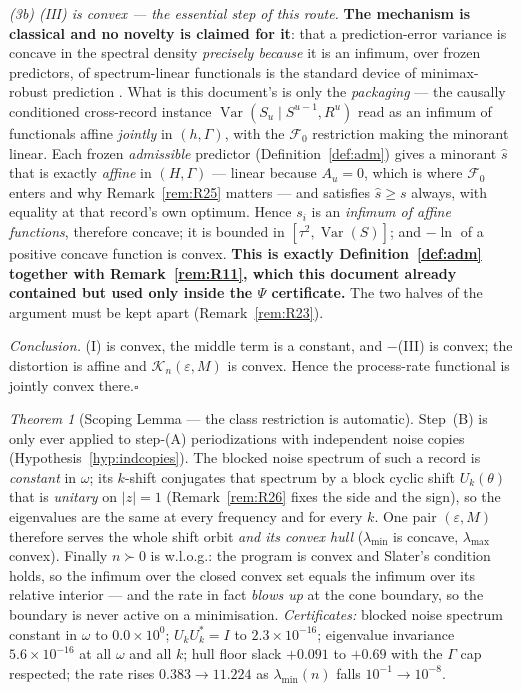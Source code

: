 \documentclass[11pt]{article}
\theoremstyle{definition}
\theoremstyle{remark}
\newtheorem{namedthm}{Theorem}
\begin{document}
\emph{(3b) (III) is convex --- the essential step of this route.}
\textbf{The mechanism is classical and no novelty is claimed for it}:
that a prediction-error variance is concave in the spectral density
\emph{precisely because} it is an infimum, over frozen predictors, of
spectrum-linear functionals is the standard device of minimax-robust
prediction \cite{bib:vp84,bib:franke85}. What is this document's is
only the \emph{packaging} --- the causally conditioned cross-record
instance $\operatorname{Var}(S_u\mid S^{u-1},R^u)$ read as an infimum
of functionals affine \emph{jointly} in $(h,\Gamma)$, with the
$\mathcal F_0$ restriction making the minorant linear. Each frozen
\emph{admissible} predictor (Definition~\ref{def:adm}) gives a minorant
$\hat s$ that is exactly \emph{affine} in $(H,\Gamma)$ --- linear
because $A_u=0$, which is where $\mathcal F_0$ enters and why
Remark~\ref{rem:R25} matters --- and satisfies $\hat s\ge s$ always,
with equality at that record's own optimum. Hence $s_i$ is an
\emph{infimum of affine functions}, therefore concave; it is bounded in
$[\tau^2,\operatorname{Var}(S)]$; and $-\ln$ of a positive concave
function is convex. \textbf{This is exactly
Definition~\ref{def:adm} together with Remark~\ref{rem:R11}, which this
document already contained but used only inside the $\Psi$
certificate.} The two halves of the argument must be kept apart
(Remark~\ref{rem:R23}).

\emph{Conclusion.} (I) is convex, the middle term is a constant, and
$-$(III) is convex; the distortion is affine and
$\mathcal K_n(\varepsilon,M)$ is convex. Hence the process-rate
functional is jointly convex there.\hfill$\square$

\begin{namedthm}[Scoping Lemma --- the class restriction is automatic]
\label{lem:scoping}
Step~(B) is only ever applied to step-(A) periodizations with
independent noise copies (Hypothesis~\ref{hyp:indcopies}). The blocked
noise spectrum of such a record is \emph{constant} in $\omega$; its
$k$-shift conjugates that spectrum by a block cyclic shift
$U_k(\theta)$ that is \emph{unitary} on $|z|=1$
(Remark~\ref{rem:R26} fixes the side and the sign), so the eigenvalues
are the same at every frequency and for every $k$. One pair
$(\varepsilon,M)$ therefore serves the whole shift orbit \emph{and its
convex hull} ($\lambda_{\min}$ is concave, $\lambda_{\max}$ convex).
Finally $n\succ0$ is w.l.o.g.: the program is convex and Slater's
condition holds, so the infimum over the closed convex set equals the
infimum over its relative interior --- and the rate in fact
\emph{blows up} at the cone boundary, so the boundary is never active
on a minimisation.
\emph{Certificates:} blocked noise spectrum constant in $\omega$ to
$0.0\times10^{0}$; $U_kU_k^\ast=I$ to $2.3\times10^{-16}$; eigenvalue
invariance $5.6\times10^{-16}$ at all $\omega$ and all $k$; hull floor
slack $+0.091$ to $+0.69$ with the $\Gamma$ cap respected; the rate
rises $0.383\to11.224$ as $\lambda_{\min}(n)$ falls $10^{-1}\to
10^{-8}$.
\end{namedthm}
\end{document}
